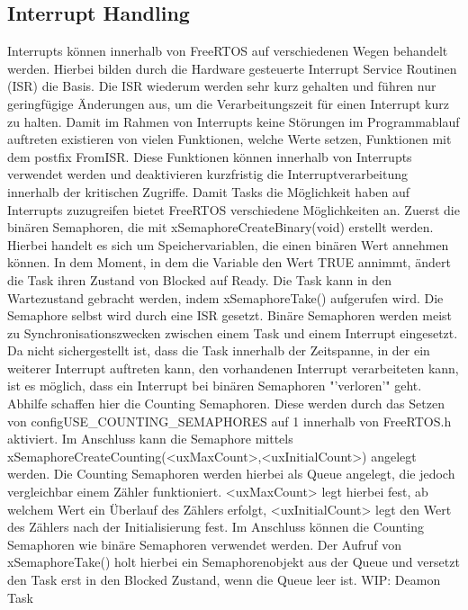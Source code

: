 \subsection{Interrupt Handling}
Interrupts können innerhalb von FreeRTOS auf verschiedenen Wegen behandelt werden. Hierbei bilden durch die Hardware gesteuerte Interrupt Service Routinen (ISR) die Basis. Die ISR wiederum werden sehr kurz gehalten und führen nur geringfügige Änderungen aus, um die Verarbeitungszeit für einen Interrupt kurz zu halten. Damit im Rahmen von Interrupts keine Störungen im Programmablauf auftreten existieren von vielen Funktionen, welche Werte setzen, Funktionen mit dem postfix FromISR. Diese Funktionen können innerhalb von Interrupts verwendet werden und deaktivieren kurzfristig die Interruptverarbeitung innerhalb der kritischen Zugriffe.
Damit Tasks die Möglichkeit haben auf Interrupts zuzugreifen bietet FreeRTOS verschiedene Möglichkeiten an. Zuerst die binären Semaphoren, die mit xSemaphoreCreateBinary(void) erstellt werden. Hierbei handelt es sich um Speichervariablen, die einen binären Wert annehmen können. In dem Moment, in dem die Variable den Wert TRUE annimmt, ändert die Task ihren Zustand von Blocked auf Ready. Die Task kann in den Wartezustand gebracht werden, indem xSemaphoreTake() aufgerufen wird. Die Semaphore selbst wird durch eine ISR gesetzt. Binäre Semaphoren werden meist zu Synchronisationszwecken zwischen einem Task und einem Interrupt eingesetzt.
Da nicht sichergestellt ist, dass die Task innerhalb der Zeitspanne, in der ein weiterer Interrupt auftreten kann, den vorhandenen Interrupt verarbeiteten kann, ist es möglich, dass ein Interrupt bei binären Semaphoren "'verloren'" geht. Abhilfe schaffen hier die Counting Semaphoren. Diese werden durch das Setzen von configUSE_COUNTING_SEMAPHORES auf 1 innerhalb von FreeRTOS.h aktiviert. Im Anschluss kann die Semaphore mittels xSemaphoreCreateCounting(<uxMaxCount>,<uxInitialCount>) angelegt werden. Die Counting Semaphoren werden hierbei als Queue angelegt, die jedoch vergleichbar einem Zähler funktioniert. <uxMaxCount> legt hierbei fest, ab welchem Wert ein Überlauf des Zählers erfolgt, <uxInitialCount> legt den Wert des Zählers nach der Initialisierung fest. Im Anschluss können die Counting Semaphoren wie binäre Semaphoren verwendet werden. Der Aufruf von xSemaphoreTake() holt hierbei ein Semaphorenobjekt aus der Queue und versetzt den Task erst in den Blocked Zustand, wenn die Queue leer ist.
WIP: Deamon Task
